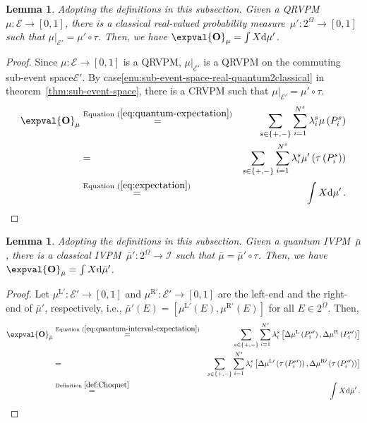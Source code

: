 \documentclass[12pt]{iopart}
\theoremstyle{plain}
\newtheorem{lemma}[thm]{Lemma}
\theoremstyle{definition}
\theoremstyle{remark}
\newcommand{\events}{\ensuremath{\mathcal{E}}}
\newcommand{\mul}[1][]{\ensuremath{\mu^{\mathrm{L{#1}}}}}
\newcommand{\mur}[1][]{\ensuremath{\mu^{\mathrm{R{#1}}}}}
\newcommand{\nb}{\nolinebreak[3] }
\begin{document}
\begin{lemma}\label{lemma:real-expectation-value-between-classical-quantum}Adopting
the definitions in this subsection. Given a QRVPM~$\mu:\events\rightarrow\left[0,1\right]$,
there is a classical real-valued probability measure~$\mu':2^{\Omega}\rightarrow\left[0,1\right]$
such that $\mu|_{\events'}=\mu'\circ\tau$. Then, we have $\expval{\mathbf{O}}_{\mu}=\int X\rmd\mu'$.\end{lemma}

\begin{proof}Since $\mu:\events\rightarrow\left[0,1\right]$ is a
QRVPM, $\mu|_{\events'}$ is a QRVPM on the commuting sub-event space\nb$\events'$.
By case\nb\ref{enu:sub-event-space-real-quantum2classical} in theorem~\ref{thm:sub-event-space},
there is a CRVPM such that $\mu|_{\events'}=\mu'\circ\tau$. 
\begin{eqnarray*}
\expval{\mathbf{O}}_{\mu} & \stackrel{\textrm{Equation }(\ref{eq:quantum-expectation})}{=} & \sum_{s\in\left\{ +,-\right\} }\sum_{i=1}^{N^{s}}\lambda_{i}^{s}\mu\left(P_{i}^{s}\right)\\
 & = & \sum_{s\in\left\{ +,-\right\} }\sum_{i=1}^{N^{s}}\lambda_{i}^{s}\mu'\left(\tau\left(P_{i}^{s}\right)\right)\\
 & \stackrel{\textrm{Equation }(\ref{eq:expectation})}{=} & \int X\rmd\mu'\,.
\end{eqnarray*}
\end{proof}

\begin{lemma}\label{lemma:interval-expectation-value-between-classical-quantum}Adopting
the definitions in this subsection. Given a quantum IVPM~$\bar{\mu}$,
there is a classical IVPM~$\bar{\mu}':2^{\Omega}\rightarrow\mathscr{I}$
such that $\bar{\mu}=\bar{\mu}'\circ\tau$. Then, we have $\expval{\mathbf{O}}_{\bar{\mu}}=\int X\rmd\bar{\mu}'$.\end{lemma}

\begin{proof}Let $\mul[\prime]:\events'\rightarrow\left[0,1\right]$
and $\mur[\prime]:\events'\rightarrow\left[0,1\right]$ are the left-end
and the right-end of $\bar{\mu}'$, respectively, i.e., $\bar{\mu}'\left(E\right)=\left[\mul[\prime]\left(E\right),\mur[\prime]\left(E\right)\right]$
for all $E\in2^{\Omega}$. Then, 
\begin{eqnarray*}
\expval{\mathbf{O}}_{\bar{\mu}} & \stackrel{\textrm{Equation }(\ref{eq:quantum-interval-expectation})}{=} & \sum_{s\in\left\{ +,-\right\} }\sum_{i=1}^{N^{s}}\lambda_{i}^{s}\left[\Delta\mul\left(P_{i}^{s\prime}\right),\Delta\mur\left(P_{i}^{s\prime}\right)\right]\\
 & = & \sum_{s\in\left\{ +,-\right\} }\sum_{i=1}^{N^{s}}\lambda_{i}^{s}\left[\Delta\mul[\prime]\left(\tau\left(P_{i}^{s\prime}\right)\right),\Delta\mur[\prime]\left(\tau\left(P_{i}^{s\prime}\right)\right)\right]\\
 & \stackrel{\textrm{Definition }\ref{def:Choquet}}{=} & \int X\rmd\bar{\mu}'\,.
\end{eqnarray*}
\end{proof}
\end{document}
